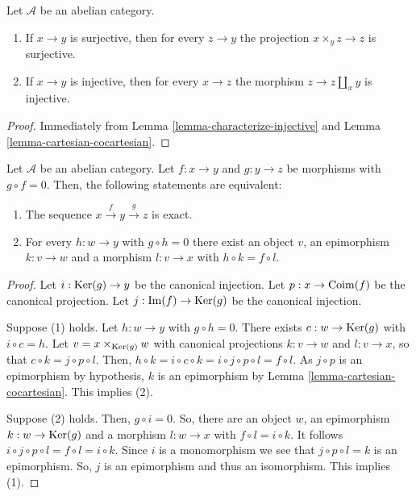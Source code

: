 \begin{lemma}
\label{lemma-epimorphism-universal-abelian-category}
Let $\mathcal{A}$ be an abelian category.
\begin{enumerate}
\item If $x \to y$ is surjective, then for every $z \to y$ the
projection $x \times_y z \to z$ is surjective.
\item If $x \to y$ is injective, then for every $x \to z$ the
morphism $z \to z \amalg_x y$ is injective.
\end{enumerate}
\end{lemma}

\begin{proof}
Immediately from Lemma \ref{lemma-characterize-injective} and
Lemma \ref{lemma-cartesian-cocartesian}.
\end{proof}

\begin{lemma}
\label{lemma-check-exactness-fibre-product}
Let $\mathcal{A}$ be an abelian category. Let $f:x\to y$ and $g:y\to z$ 
be morphisms with $g\circ f=0$. Then, the following statements are equivalent:
\begin{enumerate}
\item The sequence $x\overset{f}\to y\overset{g}\to z$ is exact.
\item For every $h:w\to y$ with $g\circ h=0$ there exist an object $v$, 
an epimorphism $k:v\to w$ and a morphism $l:v\to x$ with $h\circ k=f\circ l$.
\end{enumerate}
\end{lemma}

\begin{proof}
Let $i:\mathop{\mathrm{Ker}}(g)\to y$ be the canonical injection. Let 
$p:x\to\mathop{\mathrm{Coim}}(f)$ be the canonical projection. Let 
$j:\mathop{\mathrm{Im}}(f)\to\mathop{\mathrm{Ker}}(g)$ be the canonical injection.

\medskip\noindent
Suppose (1) holds. Let $h:w\to y$ with $g\circ h=0$. There exists 
$c:w\to\mathop{\mathrm{Ker}}(g)$ with $i\circ c=h$. 
Let $v=x\times_{\mathop{\mathrm{Ker}}(g)}w$ with canonical projections 
$k:v\to w$ and $l:v\to x$, so that $c\circ k=j\circ p\circ l$. 
Then, $h\circ k=i\circ c\circ k=i\circ j\circ p\circ l=f\circ l$. 
As $j\circ p$ is an epimorphism by hypothesis, $k$ is an 
epimorphism by Lemma \ref{lemma-cartesian-cocartesian}. This implies (2).

\medskip\noindent
Suppose (2) holds. Then, $g\circ i=0$. So, there are an object 
$w$, an epimorphism $k:w\to\mathop{\mathrm{Ker}}(g)$ and a morphism 
$l:w\to x$ with $f\circ l=i\circ k$. It follows 
$i\circ j\circ p\circ l=f\circ l=i\circ k$. Since $i$ is a 
monomorphism we see that $j\circ p\circ l=k$ is an epimorphism. 
So, $j$ is an epimorphism and thus an isomorphism. This implies (1).
\end{proof}


